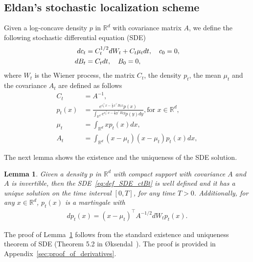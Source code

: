 \documentclass[11pt,twoside]{article}
\newcommand{\co}{A}
\theoremstyle{named}
\theoremstyle{plain}
\newtheorem{lemma}{Lemma}
\newcommand{\usedim}{\ensuremath{d}}
\newcommand{\dims}{\usedim}
\newcommand{\real}{\ensuremath{\mathbb{R}}}
\newcommand{\parenth}[1]{\left( #1 \right)}
\newcommand{\tp}{^\top}
\begin{document}
\subsection{Eldan's stochastic localization scheme} %
\label{sub:the_stochastic_localization_scheme}
Given a log-concave density $p$ in $\real^\dims$ with covariance matrix $\co$, we define the following stochastic differential equation (SDE)
\begin{align}
  \label{eq:def_SDE_ctBt}
  dc_t &= C_t^{1/2}dW_t + C_t \mu_t dt,\quad c_0 = 0,\\
  dB_t &= C_t dt,\quad B_0 = 0, \notag
\end{align}
where $W_t$ is the Wiener process, the matrix $C_t$, the density $p_t$, the mean $\mu_t$ and the covariance $A_t$ are defined as follows
\begin{align}
  \label{eq:def_SDE_parameters}
  C_t &= \co^{-1}, \\
  p_t(x) &= \frac{e^{c_t\tp x - \frac{1}{2}x\tp B_t x} p(x)}{\int_{\real^\dims} e^{c_t \tp x - \frac{1}{2}y\tp B_t y} p(y) dy}, \text{for $x \in \real^\dims$},\\
  \mu_t &= \int_{\real^\dims} x p_t(x)dx, \\
  A_t &= \int_{\real^\dims} \parenth{x - \mu_t}\parenth{x - \mu_t} p_t(x) dx,
\end{align}


The next lemma shows the existence and the uniqueness of the SDE solution.
\begin{lemma}
  \label{lem:existence_SDE_solution}
  Given a density $p$ in $\real^\dims$ with compact support with covariance $\co$ and $\co$ is invertible, then the SDE~\eqref{eq:def_SDE_ctBt} is well defined and it has a unique solution on the time interval $[0, T]$, for any time $T > 0$. Additionally, for any $x \in \real^\dims$, $p_t(x)$ is a martingale with
  \begin{align}
    \label{eq:derivative_pt}
    dp_t(x) = \parenth{x - \mu_t}\tp \co^{-1/2} dW_t p_t(x).
  \end{align}
\end{lemma}
The proof of Lemma~\ref{lem:existence_SDE_solution} follows from the standard existence and uniqueness theorem of SDE (Theorem 5.2 in {\O}ksendal~\cite{oksendal2003stochastic}). The proof is provided in Appendix~\ref{sec:proof_of_derivatives}.
\end{document}
